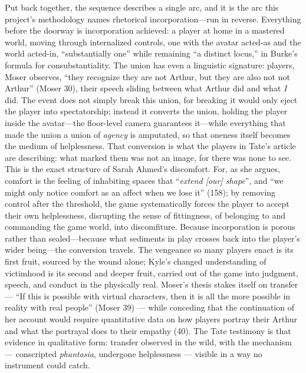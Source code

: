 Put back together, the sequence describes a single arc, and it is the arc this project's methodology names rhetorical incorporation---run in reverse. Everything before the doorway is incorporation achieved: a player at home in a mastered world, moving through internalized controls, one with the avatar acted-as and the world acted-in, ``substantially one'' while remaining ``a distinct locus,'' in Burke's formula for consubstantiality.
The union has even a linguistic signature: players, Moser observes, ``they recognize they are not Arthur, but they are also not not Arthur'' (Moser 30), their speech sliding between what Arthur did and what \textit{I} did. The event does not simply break this union, for breaking it would only eject the player into spectatorship; instead it converts the union, holding the player inside the avatar---the floor-level camera guarantees it---while everything that made the union a union of \textit{agency} is amputated, so that oneness itself becomes the medium of helplessness. That conversion is what the players in Tate's article are describing: what marked them was not an image, for there was none to see. This is the exact structure of Sarah Ahmed's discomfort. For, as she argues, comfort is the feeling of inhabiting spaces that ``\textit{extend [our] shape}'', and ``we might only notice comfort as an affect when we lose it'' (158); by removing control after the threshold, the game systematically forces the player to accept their own helplessness, disrupting the sense of fittingness, of belonging to and commanding the game world, into discomfiture. Because incorporation is porous rather than sealed---because what sediments in play crosses back into the player's wider being---the conversion travels. The vengeance so many players enact is its first fruit, sourced by the wound alone; Kyle's changed understanding of victimhood is its second and deeper fruit, carried out of the game into judgment, speech, and conduct in the physically real.
Moser's thesis stakes itself on transfer — ``If this is possible with virtual characters, then it is all the more possible in reality with real people'' (Moser 39) — while conceding that the continuation of her account would require quantitative data on how players portray their Arthur and what the portrayal does to their empathy (40). The Tate testimony is that evidence in qualitative form: transfer observed in the wild, with the mechanism — conscripted \textit{phantasia}, undergone helplessness — visible in a way no instrument could catch.

